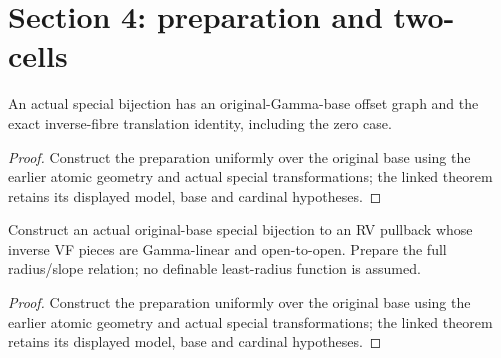 \section{Section 4: preparation and two-cells}


\begin{lemma}

\label{s4-1}


\leanok

An actual special bijection has an original-Gamma-base offset graph and the exact inverse-fibre translation identity, including the zero case.

\end{lemma}

\begin{proof}


\leanok

Construct the preparation uniformly over the original base using the earlier atomic geometry and actual special transformations; the linked theorem retains its displayed model, base and cardinal hypotheses.

\end{proof}

\begin{lemma}

\label{s4-2}


\leanok

Construct an actual original-base special bijection to an RV pullback whose inverse VF pieces are Gamma-linear and open-to-open. Prepare the full radius/slope relation; no definable least-radius function is assumed.

\end{lemma}

\begin{proof}


\leanok

Construct the preparation uniformly over the original base using the earlier atomic geometry and actual special transformations; the linked theorem retains its displayed model, base and cardinal hypotheses.

\end{proof}

